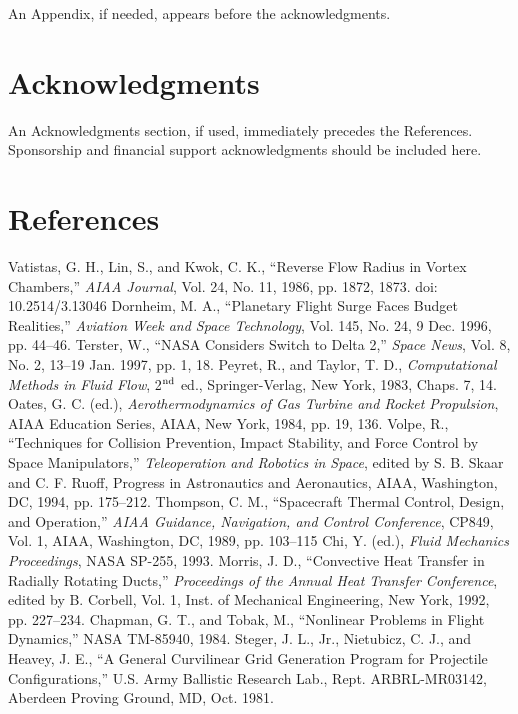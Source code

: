 \documentclass{AIAA}
\begin{document}
An Appendix, if needed, appears before the acknowledgments.

\section*{Acknowledgments}
An Acknowledgments section, if used, immediately precedes the References. Sponsorship and financial support acknowledgments should be included here.

\section*{References}

\begin{thebibliography}{}
 Vatistas, G. H., Lin, S., and Kwok, C. K., ``Reverse Flow Radius in Vortex Chambers,'' \textit{AIAA Journal}, Vol. 24, No. 11, 1986, pp. 1872, 1873. doi: 10.2514/3.13046
 Dornheim, M. A., ``Planetary Flight Surge Faces Budget Realities,'' \textit{Aviation Week and Space Technology}, Vol. 145, No. 24, 9 Dec. 1996, pp. 44--46.
 Terster, W., ``NASA Considers Switch to Delta 2,'' \textit{Space News}, Vol. 8, No. 2, 13--19 Jan. 1997, pp. 1, 18.
 Peyret, R., and Taylor, T. D., \textit{Computational Methods in Fluid Flow}, 2$^{{\rm nd}}$ ed., Springer-Verlag, New York, 1983, Chaps. 7, 14.
 Oates, G. C. (ed.), \textit{Aerothermodynamics of Gas Turbine and Rocket Propulsion}, AIAA Education Series, AIAA, New York, 1984, pp. 19, 136.
 Volpe, R., ``Techniques for Collision Prevention, Impact Stability, and Force Control by Space Manipulators,'' \textit{Teleoperation and Robotics in Space}, edited by S. B. Skaar and C. F. Ruoff, Progress in Astronautics and Aeronautics, AIAA, Washington, DC, 1994, pp. 175--212.
 Thompson, C. M., ``Spacecraft Thermal Control, Design, and Operation,'' \textit{AIAA Guidance, Navigation, and Control Conference}, CP849, Vol. 1, AIAA, Washington, DC, 1989, pp. 103--115
 Chi, Y. (ed.), \textit{Fluid Mechanics Proceedings}, NASA SP-255, 1993.
 Morris, J. D., ``Convective Heat Transfer in Radially Rotating Ducts,'' \textit{Proceedings of the Annual Heat Transfer Conference}, edited by B. Corbell, Vol. 1, Inst. of Mechanical Engineering, New York, 1992, pp. 227--234.
 Chapman, G. T., and Tobak, M., ``Nonlinear Problems in Flight Dynamics,'' NASA TM-85940, 1984.
 Steger, J. L., Jr., Nietubicz, C. J., and Heavey, J. E., ``A General Curvilinear Grid Generation Program for Projectile Configurations,'' U.S. Army Ballistic Research Lab., Rept. ARBRL-MR03142, Aberdeen Proving Ground, MD, Oct. 1981.

\end{thebibliography}
\end{document}
